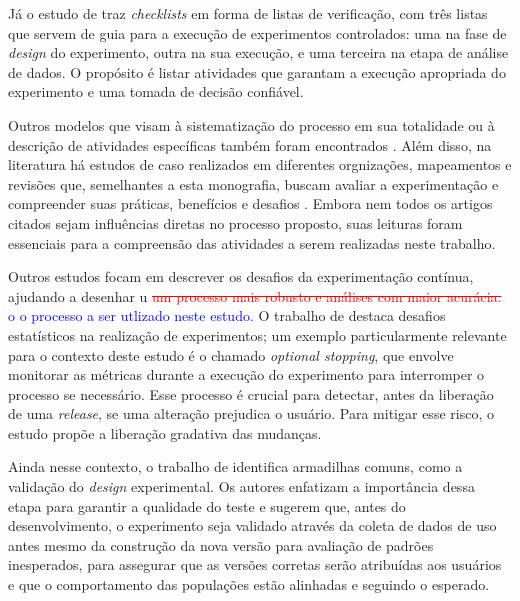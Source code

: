 Já o estudo de \cite{fabijan_three_2019} traz \textit{checklists} em forma de listas de verificação, com três listas que servem de guia para a execução de experimentos controlados: uma na fase de \textit{design} do experimento, outra na sua execução, e uma terceira na etapa de análise de dados. O propósito é listar atividades que garantam a execução apropriada do experimento e uma tomada de decisão confiável.

Outros modelos que visam à sistematização do processo em sua totalidade ou à descrição de atividades específicas também foram encontrados \cite{fagerholm_right_2017, issa_mattos_hurrier_2023, olsson_opinions_2014}. Além disso, na literatura há estudos de caso realizados em diferentes orgnizações, mapeamentos e revisões que, semelhantes a esta monografia, buscam avaliar a experimentação e compreender suas práticas, benefícios e desafios \cite{kevic_characterizing_2017, kuhrmann_activity_2018, fernandes_hitting_2015, sauvola_towards_2015, issa_mattos_hurrier_2023, kohavi_online_2013, fabijan_benefits_2017, quin_b_2024, erthal_characterization_2023, larsen_statistical_2024}. Embora nem todos os artigos citados sejam influências diretas no processo proposto, suas leituras foram essenciais para a compreensão das atividades a serem realizadas neste trabalho.

Outros estudos focam em descrever os desafios da experimentação contínua, ajudando a desenhar u \textcolor{red}{\st{ um processo mais robusto e análises com maior acurácia.}} \textcolor{blue}{o o processo a ser utlizado neste estudo.} O trabalho de  destaca desafios estatísticos na realização de experimentos; um exemplo particularmente relevante para o contexto deste estudo é o chamado \textit{optional stopping}, que envolve monitorar as métricas durante a execução do experimento para interromper o processo se necessário. Esse processo é crucial para detectar, antes da liberação de uma \textit{release}, se uma alteração prejudica o usuário. Para mitigar esse risco, o estudo propõe a liberação gradativa das mudanças.



Ainda nesse contexto, o trabalho de  identifica armadilhas comuns, como a validação do \textit{design} experimental. Os autores enfatizam a importância dessa etapa para garantir a qualidade do teste e sugerem que, antes do desenvolvimento, o experimento seja validado através da coleta de dados de uso antes mesmo da construção da nova versão para avaliação de padrões inesperados, para assegurar que as versões corretas serão atribuídas aos usuários e que o comportamento das populações estão alinhadas e seguindo o esperado.

